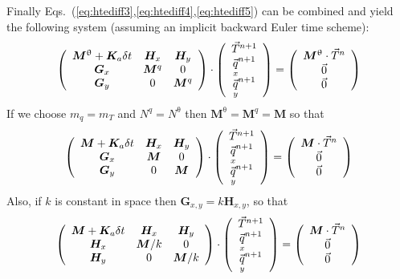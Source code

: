 Finally Eqs.~(\ref{eq:htediff3},\ref{eq:htediff4},\ref{eq:htediff5}) 
can be combined and yield the following system (assuming an implicit backward 
Euler time scheme):
\[
\left(
\begin{array}{ccc}
{\bm M}^\uptheta + {\bm K}_a \delta t & {\bm H}_x & {\bm H}_y \\
{\bm G}_x & {\bm M}^q & 0 \\
{\bm G}_y & 0 & {\bm M}^q 
\end{array}
\right)
\cdot
\left(
\begin{array}{c}
\vec{T}^{n+1}\\
\vec{\underset{\tiny x}{q}}^{n+1}\\
\vec{\underset{\tiny y}{q}}^{n+1}
\end{array}
\right)
=
\left(
\begin{array}{c}
{\bm M}^\uptheta \cdot \vec{T}^n\\
\vec{0} \\
\vec{0}
\end{array}
\right)
\]
If we choose $m_q=m_T$ and $N^q=N^\uptheta$ then
${\bm M}^\uptheta = {\bm M}^q = {\bm M}$ 
so that 
\[
\left(
\begin{array}{ccc}
{\bm M} + {\bm K}_a \delta t & {\bm H}_x & {\bm H}_y \\
{\bm G}_x & {\bm M} & 0 \\
{\bm G}_y & 0 & {\bm M}
\end{array}
\right)
\cdot
\left(
\begin{array}{c}
\vec{T}^{n+1}\\
\vec{\underset{\tiny x}{q}}^{n+1}\\
\vec{\underset{\tiny y}{q}}^{n+1}
\end{array}
\right)
=
\left(
\begin{array}{c}
{\bm M} \cdot \vec{T}^n\\
\vec{0} \\
\vec{0}
\end{array}
\right)
\]
Also, if $k$ is constant in space then ${\bm G}_{x,y}=k {\bm H}_{x,y}$, 
so that
\[
\left(
\begin{array}{ccc}
{\bm M} + {\bm K}_a \delta t & {\bm H}_x & {\bm H}_y \\
{\bm H}_x & {\bm M}/k & 0 \\
{\bm H}_y & 0 & {\bm M}/k
\end{array}
\right)
\cdot
\left(
\begin{array}{c}
\vec{T}^{n+1}\\
\vec{\underset{\tiny x}{q}}^{n+1}\\
\vec{\underset{\tiny y}{q}}^{n+1}
\end{array}
\right)
=
\left(
\begin{array}{c}
{\bm M} \cdot \vec{T}^n\\
\vec{0} \\
\vec{0}
\end{array}
\right)
\]

